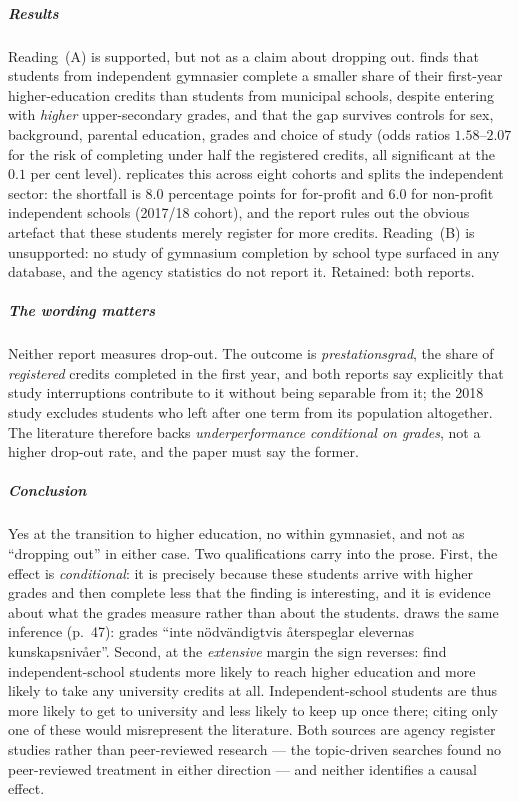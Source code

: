 \subparagraph{Results}
Reading~(A) is supported, but not as a claim about dropping out.
\Textcite{Skolverket2018Hogskola} finds that students from independent
gymnasier complete a smaller share of their first-year higher-education
credits than students from municipal schools, despite entering with
\emph{higher} upper-secondary grades, and that the gap survives controls
for sex, background, parental education, grades and choice of study
(odds ratios \(1.58\)--\(2.07\) for the risk of completing under half the
registered credits, all significant at the \(0.1\) per cent level).
\Textcite{UKASkolverket2024} replicates this across eight cohorts and
splits the independent sector: the shortfall is \(8.0\) percentage points
for for-profit and \(6.0\) for non-profit independent schools
(2017/18 cohort), and the report rules out the obvious artefact that
these students merely register for more credits.
Reading~(B) is unsupported: no study of gymnasium completion by school
type surfaced in any database, and the agency statistics do not report
it.
Retained: both reports.

\subparagraph{The wording matters}
Neither report measures drop-out.  The outcome is
\emph{prestationsgrad}, the share of \emph{registered} credits completed
in the first year, and both reports say explicitly that study
interruptions contribute to it without being separable from
it\autocite[p.~9]{Skolverket2018Hogskola}\autocite[p.~20]{UKASkolverket2024};
the 2018 study excludes students who left after one term from its
population altogether.
The literature therefore backs \emph{underperformance conditional on
grades}, not a higher drop-out rate, and the paper must say the former.

\subparagraph{Conclusion}
Yes at the transition to higher education, no within gymnasiet, and not
as \enquote{dropping out} in either case.  Two qualifications carry into
the prose.
First, the effect is \emph{conditional}: it is precisely because these
students arrive with higher grades and then complete less that the
finding is interesting, and it is evidence about what the grades measure
rather than about the students.  \Textcite{UKASkolverket2024} draws the
same inference (p.~47): grades \enquote{inte nödvändigtvis återspeglar
elevernas kunskapsnivåer}.
Second, at the \emph{extensive} margin the sign reverses:
\textcite{EdmarkPersson2021} find independent-school students more likely
to reach higher education and more likely to take any university credits
at all.  Independent-school students are thus more likely to get to
university and less likely to keep up once there; citing only one of
these would misrepresent the literature.
Both sources are agency register studies rather than peer-reviewed
research --- the topic-driven searches found no peer-reviewed treatment
in either direction --- and neither identifies a causal effect.
